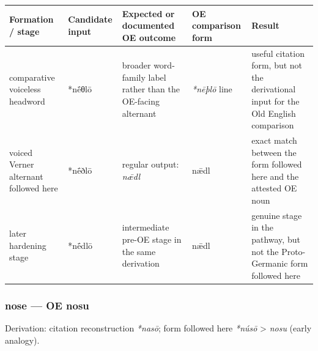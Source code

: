 \documentclass[
  british,
  a4paper,
]{article}
\newcounter{none} %
\begin{document}
{\def\LTcaptype{none} %
\begin{longtable}[]{@{}
  >{\raggedright\arraybackslash}p{}
  >{\raggedright\arraybackslash}p{}
  >{\raggedright\arraybackslash}p{}
  >{\raggedright\arraybackslash}p{}
  >{\raggedright\arraybackslash}p{}@{}}
\toprule\noalign{}
\begin{minipage}[b]{\linewidth}\raggedright
Formation / stage
\end{minipage} & \begin{minipage}[b]{\linewidth}\raggedright
Candidate input
\end{minipage} & \begin{minipage}[b]{\linewidth}\raggedright
Expected or documented OE outcome
\end{minipage} & \begin{minipage}[b]{\linewidth}\raggedright
OE comparison form
\end{minipage} & \begin{minipage}[b]{\linewidth}\raggedright
Result
\end{minipage} \\
\midrule\noalign{}
\endhead
\bottomrule\noalign{}
\endlastfoot
comparative voiceless headword & *nḗθlō & broader word-family label
rather than the OE-facing alternant & \emph{*nēþlō} line & useful
citation form, but not the derivational input for the Old English
comparison \\
voiced Verner alternant followed here & *nḗðlō & regular output:
\emph{nǣdl} & nǣdl & exact match between the form followed here and the
attested OE noun \\
later hardening stage & *nḗdlō & intermediate pre-OE stage in the same
derivation & nǣdl & genuine stage in the pathway, but not the
Proto-Germanic form followed here \\
\end{longtable}
}

\subsubsection{nose --- OE nosu}\label{nose-oe-nosu}

Derivation: citation reconstruction \emph{*nasō}; form followed here
\emph{*núsō} \textgreater{} \emph{nosu} (early analogy).
\end{document}
